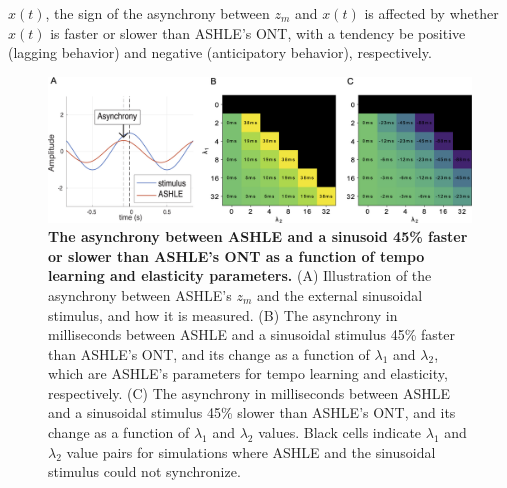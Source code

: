 \documentclass{report}
\begin{document}
$x(t)$, the sign of the asynchrony between $z_m$ and $x(t)$ is affected by whether $x(t)$ is faster or slower than ASHLE's ONT, with a tendency be positive (lagging behavior) and negative (anticipatory behavior), respectively.

\begin{figure}
    \centering
    \includegraphics[width=1.0\textwidth]{figures/fig3_6.png}
    \caption[The asynchrony between ASHLE and a sinusoid 45\% faster or slower than ASHLE's ONT as a function of tempo learning and elasticity parameters]{\textbf{The asynchrony between ASHLE and a sinusoid 45\% faster or slower than ASHLE's ONT as a function of tempo learning and elasticity parameters.} (A) Illustration of the asynchrony between ASHLE's $z_m$ and the external sinusoidal stimulus, and how it is measured. (B) The asynchrony in milliseconds between ASHLE and a sinusoidal stimulus 45\% faster than ASHLE's ONT, and its change as a function of $\lambda_1$ and $\lambda_2$, which are ASHLE's parameters for tempo learning and elasticity, respectively. (C) The asynchrony in milliseconds between ASHLE and a sinusoidal stimulus 45\% slower than ASHLE's ONT, and its change as a function of $\lambda_1$ and $\lambda_2$ values. Black cells indicate $\lambda_1$ and $\lambda_2$ value pairs for simulations where ASHLE and the sinusoidal stimulus could not synchronize.}
    \label{f3_6}
\end{figure}
\end{document}
